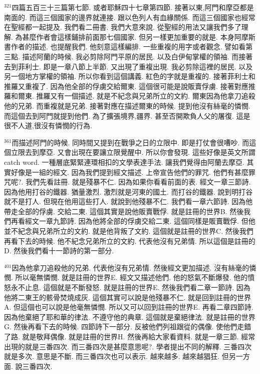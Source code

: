\documentclass{book}
\begin{document}
$^{321}$四篇五百三十三篇第七節.
或者耶穌四十七章第四節.
接著以東,阿門和摩亞都是南面的.
而這三個國家的邊界就連接.
跟以色列人有血緣關係.
而這三個國家也經常在聖經都一起提及.
我們看二冊書.
我們大意來說.
從聖經的用法又讓我們多了理解.
為甚麼作者會這樣鋪排前面那七個國家.
但另一樣更加重要的就是.
本身阿摩斯書作者的描述.
也提醒我們.
他刻意這樣編排.
一些重複的用字或者觀念.
譬如看第三點.
描述阿蘭的時候.
我必剪除阿門平原的居民.
以及白伊甸掌權的領袖.
而接著去到菲利士.
即是一章八節上半節.
又出現了重複出現.
我必剪除這裡的居民.
以及另一個地方掌權的領袖.
所以你看到這個講義.
紅色的字就是重複的.
接著菲利士和推羅又重複了.
因為他全部的俘虜交給爾東.
這個很可能是說販賣俘虜.
接著對應推羅和爾東.
推羅又有一個描述.
就是不紀念與兄弟所立的文約.
爾東因為他拿刀追殺他的兄弟.
而重複就是兄弟.
接著對應在描述爾東的時候.
提到他沒有絲毫的憐憫.
而這個去到阿門就提到他們.
為了擴張境界,疆界.
甚至否開欺負人父的屠復.
這是很不人道,很沒有憐憫的行為.

$^{361}$而描述阿門的時候.
同時間又提到在戰爭之日的立限中.
即是打仗會很嘈吵.
而這個立限去到摩亞.
又會出現在要讓立限覺醒中.
所以你會發現.
這些好像是英文所謂catch word.
一種層底緊緊連環相扣的文學表達手法.
讓我們覺得由阿蘭去摩亞.
其實好像是一組的經文.
因為我們提到經文描述.
上帝宣告他們的罪咒.
他們有甚麼罪咒呢?.
我們先看註冊.
就是殘暴不仁.
因為如果你看看前面的表.
經文一章三節詩.
因為他用打谷的鐵器.
猶量激烈.
激烈就是河東的國土.
而打谷的鐵器.
說到明打谷就不是打人.
但現在他用這些打人.
就說到他殘暴不仁.
我們看一章六節詩.
因為他帶走全部的俘虜.
交給二東.
這個其實是說他販賣戰俘.
就是註冊的世界B.
然後我們再看經文一章九節詩.
因為他將全部的俘虜交給二東.
這個同樣是販賣戰俘.
但他並不紀念與兄弟所立的文約.
就是他背叛了文約.
這個就是註冊的世界C.
然後我們再看下去的時候.
他不紀念兄弟所立的文約.
代表他沒有兄弟情.
所以這個是註冊的D.
然後我們看十一節詩的第一部分.

$^{401}$因為他拿刀追殺他的兄弟.
代表他沒有兄弟情.
然後經文更加描述.
沒有絲毫的憐憫.
所以毫無憐憫.
就是註冊的世界E.
經文又描述他們.
他的怒氣不斷爆發.
他的憤怒永不止息.
這個就是不斷發怒.
就是註冊的世界E.
然後我們看二章一節詩.
因為他將二東王的骸骨焚燒成灰.
這個其實可以說是他殘暴不仁.
就是回到註冊的世界A.
但這個也可以說是他毫無憐憫.
所以又可以回到註冊的世界E.
再看二章四節詩.
因為他棄絕了耶和華的律法.
不遵守他的典章.
這個就是棄絕律法.
就是註冊的世界G.
然後再看下去的時候.
四節詩下一部分.
反被他們列祖跟從的偶像.
使他們走錯了路.
就是敬拜偶像.
就是註冊的世界H.
然後再給大家看資料.
就是一章三節.
經常出現的就是三番四次.
而三番四次是甚麼意思呢?.
學者提出不同的解釋.
三番四次就是多次.
意思是不斷.
而三番四次也可以表示.
越來越多.
越來越猖狂.
但另一方面.
說三番四次.
\end{document}
